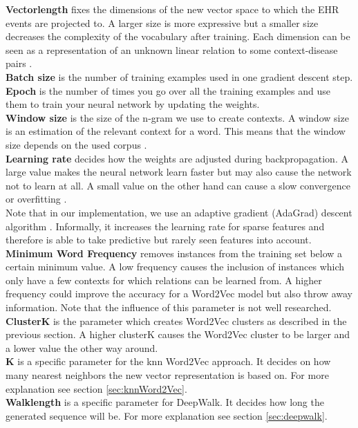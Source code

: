 \noindent\textbf{Vectorlength} fixes the dimensions of the new vector space to which the EHR events are projected to. A larger size is more expressive but a smaller size decreases the complexity of the vocabulary after training. Each dimension can be seen as a representation of an unknown linear relation to some context-disease pairs \cite{vl:article}. \\
\textbf{Batch size} is the number of training examples used in one gradient descent step. \\
\textbf{Epoch} is the number of times you go over all the training examples and use them to train your neural network by updating the weights. \\
\textbf{Window size} is the size of the n-gram we use to create contexts. A window size is an estimation of the relevant context for a word. This means that the window size depends on the used corpus \cite{w2vOriginal:article} \cite{windowSize:article}. \\
\textbf{Learning rate} decides how the weights are adjusted during backpropagation. A large value makes the neural network learn faster but may also cause the network not to learn at all. A small value on the other hand can cause a slow convergence or overfitting \cite{lr:article}. \\
Note that in our implementation, we use an adaptive gradient (AdaGrad) descent algorithm \cite{adagrad:article}. Informally, it increases the learning rate for sparse features and therefore is able to take predictive but rarely seen features into account.  \\
\textbf{Minimum Word Frequency} removes instances from the training set below a certain minimum value. A low frequency causes the inclusion of instances which only have a few contexts for which relations can be learned from. A higher frequency could improve the accuracy for a Word2Vec model but also throw away information. Note that the influence of this parameter is not well researched. \\
\textbf{ClusterK} is the parameter which creates Word2Vec clusters as described in the previous section. A higher clusterK causes the Word2Vec cluster to be larger and a lower value the other way around. \\
\textbf{K} is a specific parameter for the knn Word2Vec approach. It decides on how many nearest neighbors the new vector representation is based on. For more explanation see section \ref{sec:knnWord2Vec}. \\
\textbf{Walklength} is a specific parameter for DeepWalk. It decides how long the generated sequence will be. For more explanation see section \ref{sec:deepwalk}.

